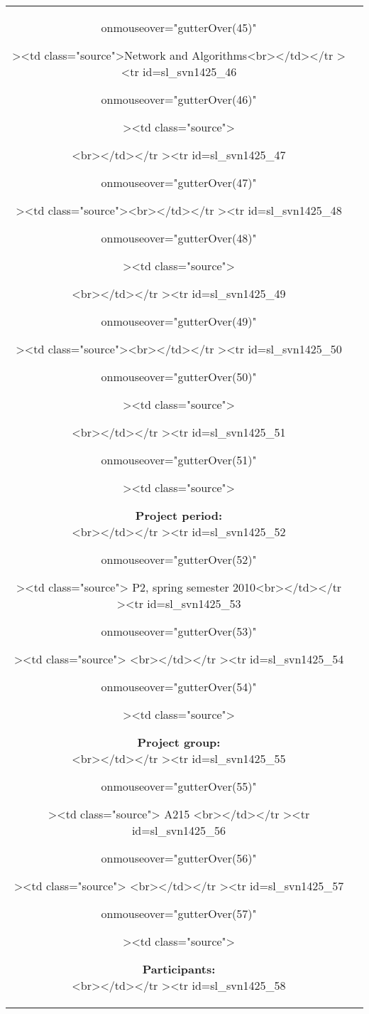 \begin{titlepage}
\begin{nopagebreak}
{\begin{tabular}{cc}
{\begin{description}
 onmouseover="gutterOver(45)"

><td class="source">Network and Algorithms<br></td></tr
><tr
id=sl_svn1425_46

 onmouseover="gutterOver(46)"

><td class="source">\end{description}<br></td></tr
><tr
id=sl_svn1425_47

 onmouseover="gutterOver(47)"

><td class="source"><br></td></tr
><tr
id=sl_svn1425_48

 onmouseover="gutterOver(48)"

><td class="source">\parbox{8cm}{<br></td></tr
><tr
id=sl_svn1425_49

 onmouseover="gutterOver(49)"

><td class="source"><br></td></tr
><tr
id=sl_svn1425_50

 onmouseover="gutterOver(50)"

><td class="source">\begin{description}<br></td></tr
><tr
id=sl_svn1425_51

 onmouseover="gutterOver(51)"

><td class="source">\item {\bf Project period:}\\<br></td></tr
><tr
id=sl_svn1425_52

 onmouseover="gutterOver(52)"

><td class="source">   P2, spring semester 2010<br></td></tr
><tr
id=sl_svn1425_53

 onmouseover="gutterOver(53)"

><td class="source">  \hspace{2cm}<br></td></tr
><tr
id=sl_svn1425_54

 onmouseover="gutterOver(54)"

><td class="source">\item {\bf Project group:}\\<br></td></tr
><tr
id=sl_svn1425_55

 onmouseover="gutterOver(55)"

><td class="source">  A215 <br></td></tr
><tr
id=sl_svn1425_56

 onmouseover="gutterOver(56)"

><td class="source">  \hspace{2cm}<br></td></tr
><tr
id=sl_svn1425_57

 onmouseover="gutterOver(57)"

><td class="source">\item {\bf Participants:}\\<br></td></tr
><tr
id=sl_svn1425_58


\end{description}}}
\end{tabular}}
\end{nopagebreak}
\end{titlepage}
